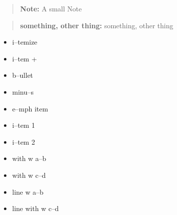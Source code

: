 \documentclass{book}
\begin{document}
\begin{titlepage}
\begin{quote}
\begin{footnotesize}
\textbf{Note:} A small Note
\end{footnotesize}
\end{quote}

\begin{quote}
\begin{footnotesize}
\textbf{something, other thing:} something, other thing
\end{footnotesize}
\end{quote}

\begin{itemize}
\item i--temize
\end{itemize}

\begin{itemize}[label=+]
\item i--tem +
\end{itemize}

\begin{itemize}[label=\textbullet{}]
\item b--ullet
\end{itemize}

\begin{itemize}[label=-]
\item minu--s
\end{itemize}

\begin{itemize}[label=\emph{after emph}]
\item e--mph item
\end{itemize}

\begin{itemize}[label=\textbullet{} a--n itemize line]
\item {}%
i--tem 1
\item i--tem 2
\end{itemize}

\begin{itemize}[label={}]
\item with w a--b
\item with w c--d
\end{itemize}

\begin{itemize}[label=\hbox{} on a line]
\item line w a--b
\item line with w c--d
\end{itemize}


\end{titlepage}
\end{document}

